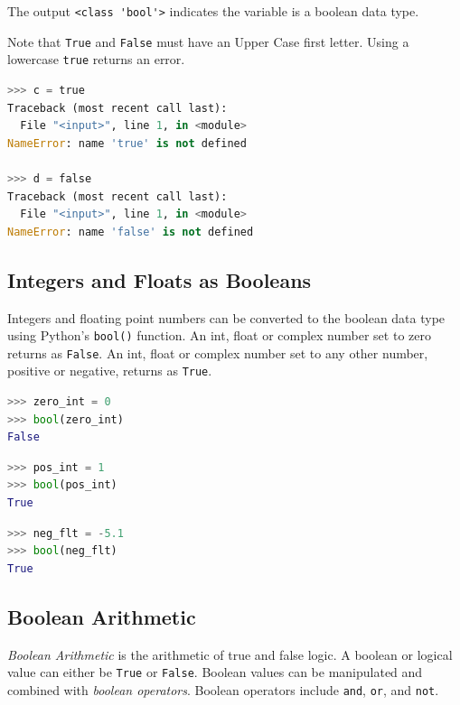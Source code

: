 \documentclass{book}
\begin{document}
The output \lstinline!<class 'bool'>! indicates the variable is a
boolean data type.

Note that \lstinline!True! and \lstinline!False! must have an Upper Case
first letter. Using a lowercase \lstinline!true! returns an error.

\begin{lstlisting}[language=Python]
>>> c = true
Traceback (most recent call last):
  File "<input>", line 1, in <module>
NameError: name 'true' is not defined
   
>>> d = false
Traceback (most recent call last):
  File "<input>", line 1, in <module>
NameError: name 'false' is not defined
\end{lstlisting}
    




    
        \subsection{Integers and Floats as
Booleans}\label{integers-and-floats-as-booleans}

Integers and floating point numbers can be converted to the boolean data
type using Python's \lstinline!bool()! function. An int, float or
complex number set to zero returns as \lstinline!False!. An int, float
or complex number set to any other number, positive or negative, returns
as \lstinline!True!.

\begin{lstlisting}[language=Python]
>>> zero_int = 0
>>> bool(zero_int)
False
\end{lstlisting}

\begin{lstlisting}[language=Python]
>>> pos_int = 1
>>> bool(pos_int)
True
\end{lstlisting}

\begin{lstlisting}[language=Python]
>>> neg_flt = -5.1
>>> bool(neg_flt)
True
\end{lstlisting}
    




    
        \subsection{Boolean Arithmetic}\label{boolean-arithmetic}

\emph{Boolean Arithmetic} is the arithmetic of true and false logic. A
boolean or logical value can either be \lstinline!True! or
\lstinline!False!. Boolean values can be manipulated and combined with
\emph{boolean operators}. Boolean operators include \lstinline!and!,
\lstinline!or!, and \lstinline!not!.
\end{document}

